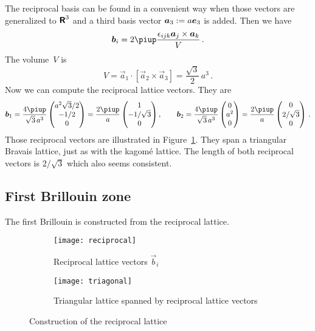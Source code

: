 \documentclass[11pt, english, fleqn, DIV=15, headinclude, BCOR=1cm]{scrartcl}
\begin{document}
The reciprocal basis can be found in a convenient way when those vectors are
generalized to $\text{\bfseries\sffamily R}^3$ and a third basis vector $\vec a_3 := a\ev_3$ is added.
Then we have
\[
    \vec b_i = 2\piup \frac{\epsilon_{ijk} \vec a_j \times \vec a_k}{V} \,.
\]
The volume~$V$ is
\[
    V = \vec a_1 \cdot [\vec a_2 \times \vec a_3]
    = \frac{\sqrt 3}{2} \, a^3 \,.
\]
Now we can compute the reciprocal lattice vectors. They are
\[
    \vec b_1 = \frac{4 \piup}{\sqrt 3 \, a^3}
    \begin{pmatrix}
        a^2 \sqrt 3/2 \\ -1/2 \\ 0
    \end{pmatrix}
    =
    \frac{2\piup}{a}
    \begin{pmatrix}
        1 \\ - 1 / \sqrt 3 \\ 0
    \end{pmatrix}
    \eqnsep
    \vec b_2 = \frac{4 \piup}{\sqrt 3 \, a^3}
    \begin{pmatrix}
        0 \\ a^2 \\ 0
    \end{pmatrix}
    =
    \frac{2\piup}{a}
    \begin{pmatrix}
        0 \\ 2 / \sqrt 3 \\ 0
    \end{pmatrix} \,.
\]
Those reciprocal vectors are illustrated in Figure~\ref{fig:reciprocal}. They
span a triangular Bravais lattice, just as with the kagomé lattice. The length
of both reciprocal vectors is $2/\sqrt 3$ which also seems consistent.

\subsection{First Brillouin zone}

The first Brillouin is constructed from the reciprocal lattice.

\begin{figure}[htbp]
    \begin{subfigure}[c]{0.5\linewidth}
        \centering
        \texttt{[image: reciprocal]}
        \caption{%
            Reciprocal lattice vectors $\vec b_i$
        }
        \label{fig:reciprocal}
    \end{subfigure}
    \begin{subfigure}[c]{0.5\linewidth}
        \centering
        \texttt{[image: triagonal]}
        \caption{%
            Triangular lattice spanned by reciprocal lattice vectors
        }
        \label{fig:triagonal}
    \end{subfigure}
    \caption{%
        Construction of the reciprocal lattice
    }
    \label{fig:brillouin-zone}
\end{figure}
\end{document}
